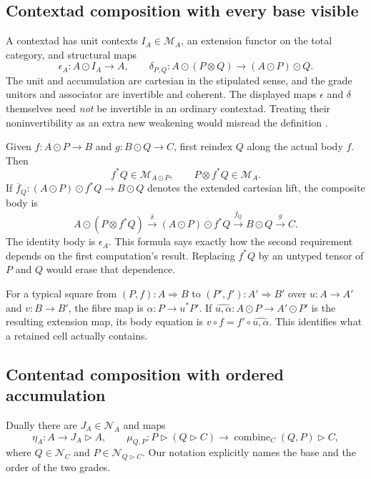 \documentclass[11pt,letterpaper]{article}
\newcommand{\comp}{\mathbin{\circ}}
\newcommand{\ext}{\mathbin{\odot}}
\newcommand{\cext}{\mathbin{\triangleright}}
\newcommand{\comb}{\operatorname{combine}}
\begin{document}
\subsection{Contextad composition with every base visible}
A contextad has unit contexts $I_A\in\mathcal M_A$, an extension functor on the total category, and structural maps
\begin{equation}\label{eq:contextstructure}
\epsilon_A:A\ext I_A\to A,\qquad
\delta_{P,Q}:A\ext(P\otimes Q)\to(A\ext P)\ext Q.
\end{equation}
The unit and accumulation are cartesian in the stipulated sense, and the grade unitors and associator are invertible and coherent. The displayed maps $\epsilon$ and $\delta$ themselves need \emph{not} be invertible in an ordinary contextad. Treating their noninvertibility as an extra new weakening would misread the definition \cite[Definitions 3.15 and 3.26]{CM}.

Given $f:A\ext P\to B$ and $g:B\ext Q\to C$, first reindex $Q$ along the actual body $f$. Then
\[
 f^*Q\in\mathcal M_{A\ext P},\qquad P\otimes f^*Q\in\mathcal M_A.
\]
If $\overline f_Q:(A\ext P)\ext f^*Q\to B\ext Q$ denotes the extended cartesian lift, the composite body is
\begin{equation}\label{eq:ctxcomp}
A\ext(P\otimes f^*Q)
 \xrightarrow{\delta} (A\ext P)\ext f^*Q
 \xrightarrow{\overline f_Q} B\ext Q
 \xrightarrow{g} C.
\end{equation}
The identity body is $\epsilon_A$. This formula says exactly how the second requirement depends on the first computation's result. Replacing $f^*Q$ by an untyped tensor of $P$ and $Q$ would erase that dependence.

For a typical square from $(P,f):A\Rightarrow B$ to $(P',f'):A'\Rightarrow B'$ over $u:A\to A'$ and $v:B\to B'$, the fibre map is $\alpha:P\to u^*P'$. If $\widehat{u,\alpha}:A\ext P\to A'\ext P'$ is the resulting extension map, its body equation is $v\comp f=f'\comp\widehat{u,\alpha}$. This identifies what a retained cell actually contains.

\subsection{Contentad composition with ordered accumulation}
Dually there are $J_A\in\mathcal N_A$ and maps
\begin{equation}\label{eq:contentstructure}
\eta_A:A\to J_A\cext A,\qquad
\mu_{Q,P}:P\cext(Q\cext C)\to\comb_C(Q,P)\cext C,
\end{equation}
where $Q\in\mathcal N_C$ and $P\in\mathcal N_{Q\cext C}$. Our notation explicitly names the base and the order of the two grades.
\end{document}
